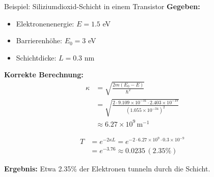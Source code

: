 \documentclass{beamer}
\begin{document}
    \begin{frame}{Beispiel: Siliziumdioxid-Schicht in einem Transistor}
        \textbf{Gegeben:}
        \begin{itemize}
            \item Elektronenenergie: $E = 1.5$ eV
            \item Barrierenhöhe: $E_0 = 3$ eV
            \item Schichtdicke: $L = 0.3$ nm
        \end{itemize}

        \textbf{Korrekte Berechnung:}
        \begin{align*}
            \kappa &= \sqrt{\frac{2m(E_0 - E)}{\hbar^2}} \\
            &= \sqrt{\frac{2 \cdot 9.109 \times 10^{-31} \cdot 2.403 \times 10^{-19}}{(1.055 \times 10^{-34})^2}} \\
            &\approx 6.27 \times 10^9 \, \text{m}^{-1}
        \end{align*}

        \begin{align*}
            T &= e^{-2 \kappa L} = e^{-2 \cdot 6.27 \times 10^9 \cdot 0.3 \times 10^{-9}} \\
            &= e^{-3.76} \approx 0.0235 \, (2.35\%)
        \end{align*}

        \textbf{Ergebnis:} Etwa 2.35\% der Elektronen tunneln durch die Schicht.
    \end{frame}
\end{document}
